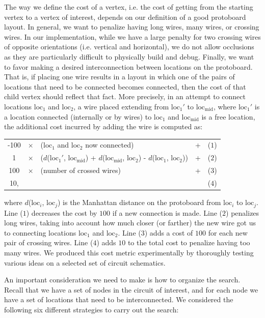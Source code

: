 The way we define the cost of a vertex, i.e. the cost of getting from the
starting vertex to a vertex of interest, depends on our definition of a good
protoboard layout. In general, we want to penalize having
long wires, many wires, or crossing wires. In our implementation, while we have
a large penalty for two crossing wires of opposite orientations (i.e. vertical
and horizontal), we do not allow occlusions as
they are particularly difficult to physically build and debug.
Finally, we want to favor making a desired interconnection between locations
on the protoboard. That is, if placing one wire results in a layout in which
one of the pairs of locations that need to be connected becomes connected, then
the cost of that child vertex should reflect that fact. More precisely, in an
attempt to connect locations $\text{loc}_1$ and $\text{loc}_2$, a wire placed extending from
$\text{loc}_1'$ to $\text{loc}_{\text{mid}}$, where $\text{loc}_1'$ is a
location connected (internally or by wires) to
$\text{loc}_1$ and
$\text{loc}_{\text{mid}}$ is a free location, the additional cost
incurred by adding the wire is computed as:
\begin{table}[H]
\centering
\begin{tabular}{ccllr}
-100 &$\times$ & ($\text{loc}_1$ and $\text{loc}_2$ now connected) &+ &($1$)\\
1 &$\times$ & ($d$($\text{loc}_1'$, $\text{loc}_{\text{mid}}$) + $d$($\text{loc}_{\text{mid}}$, $\text{loc}_2$) - $d$($\text{loc}_1$, $\text{loc}_2$)) &+ &($2$)\\
100 &$\times$ & (number of crossed wires) &+ &($3$)\\
10, & & & &($4$)
\end{tabular}
\end{table}
\noindent where $d$($\text{loc}_i$, $\text{loc}_j$) is the Manhattan distance
on the protoboard from $\text{loc}_i$ to $\text{loc}_j$.
Line ($1$) decreases the cost by $100$ if a new connection is
made. Line ($2$) penalizes long wires, taking into account how much closer (or
farther) the new wire got us to connecting locations $\text{loc}_1$ and
$\text{loc}_2$.
Line ($3$) adds a cost of $100$ for each new pair
of crossing wires. Line ($4$) adds $10$ to the total cost to penalize having
too many wires. We produced this cost metric experimentally by thoroughly
testing various ideas on a selected set of circuit schematics.

An important consideration we need to make is how to organize the
search. Recall that we have a set of nodes in the circuit of interest, and for
each node we have a set of locations that need to be interconnected.
We considered the following six different strategies to carry out the search:


